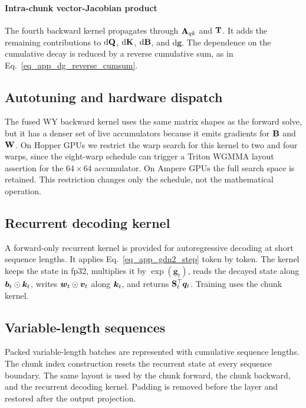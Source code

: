 \paragraph{Intra-chunk vector-Jacobian product}
The fourth backward kernel propagates through ${\mathbf{A}}_{qk}$ and ${\mathbf{T}}$. It adds the remaining contributions to $\mathrm{d}{\mathbf{Q}}$, $\mathrm{d}{\mathbf{K}}$, $\mathrm{d}{\mathbf{B}}$, and $\mathrm{d}\boldsymbol{g}$. The dependence on the cumulative decay is reduced by a reverse cumulative sum, as in Eq.~\ref{eq_app_dg_reverse_cumsum}.

\subsection{Autotuning and hardware dispatch}
\label{app_autotune}

The fused WY backward kernel uses the same matrix shapes as the forward solve, but it has a denser set of live accumulators because it emits gradients for ${\mathbf{B}}$ and ${\mathbf{W}}$. On Hopper GPUs we restrict the warp search for this kernel to two and four warps, since the eight-warp schedule can trigger a Triton WGMMA layout assertion for the $64\times64$ accumulator. On Ampere GPUs the full search space is retained. This restriction changes only the schedule, not the mathematical operation.

\subsection{Recurrent decoding kernel}
\label{app_recurrent_kernel}

A forward-only recurrent kernel is provided for autoregressive decoding at short sequence lengths. It applies Eq.~\ref{eq_app_gdn2_step} token by token. The kernel keeps the state in fp32, multiplies it by $\exp(\boldsymbol{g}_t)$, reads the decayed state along ${\bm{b}}_t\odot{\bm{k}}_t$, writes ${\bm{w}}_t\odot{\bm{v}}_t$ along ${\bm{k}}_t$, and returns ${\mathbf{S}}_t^\top{\bm{q}}_t$. Training uses the chunk kernel.

\subsection{Variable-length sequences}
\label{app_varlen}

Packed variable-length batches are represented with cumulative sequence lengths. The chunk index construction resets the recurrent state at every sequence boundary. The same layout is used by the chunk forward, the chunk backward, and the recurrent decoding kernel. Padding is removed before the layer and restored after the output projection.

